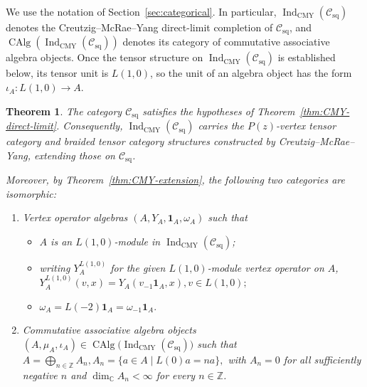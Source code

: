 \documentclass[12pt,leqno]{amsart}
\numberwithin{equation}{section} \newtheorem{thm}{Theorem}[section] \newtheorem{lem}[thm]{Lemma} \newtheorem{ex}[thm]{Example} \newtheorem{prop}[thm]{Proposition} \newtheorem{cor}[thm]{Corollary} \newtheorem{defi}[thm]{Definition} \newtheorem{rmk}[thm]{Remark} \newtheorem{notation}[thm]{Notation}
\newcommand{\one}{\mathbf{1}}
\newcommand{\Csq}{\mathcal C_{\mathrm{sq}}}
\newcommand{\CAlg}{\operatorname{CAlg}}
\newcommand{\IndCMY}{\operatorname{Ind}_{\mathrm{CMY}}}
\def\Z{\mathbb{Z}} \def\N{\mathbb{N}} \def\A{\mathbb{A}} \def\C{\mathbb{C}} \def\R{\mathbb{R}} \def\Q{\mathbb{Q}} \def\F{\mathbb{F}}
\begin{document}
We use the notation of Section~\ref{sec:categorical}. In particular, $\IndCMY(\Csq)$ denotes the Creutzig--McRae--Yang direct-limit completion of $\Csq$, and $\CAlg(\IndCMY(\Csq))$ denotes its category of commutative associative algebra objects. Once the tensor structure on $\IndCMY(\Csq)$ is established below, its tensor unit is $L(1,0)$, so the unit of an algebra object has the form \(\iota_A:L(1,0)\longrightarrow A\).
\begin{thm}\label{thm:CMY-square}
The category $\Csq$ satisfies the hypotheses of Theorem~\ref{thm:CMY-direct-limit}. Consequently, $\IndCMY(\Csq)$ carries the $P(z)$-vertex tensor category and braided tensor category structures constructed by Creutzig--McRae--Yang, extending those on $\Csq$.

Moreover, by Theorem~\ref{thm:CMY-extension}, the following two categories are isomorphic:
\begin{enumerate}[label=\textnormal{(\arabic*)}]
\item Vertex operator algebras $(A,Y_A,\one_A,\omega_A)$ such that
\begin{itemize}
\item $A$ is an $L(1,0)$-module in $\IndCMY(\Csq)$;
\item writing $Y_A^{L(1,0)}$ for the given $L(1,0)$-module vertex
operator on $A$, \(Y_A^{L(1,0)}(v,x)=Y_A(v_{-1}\one_A,x),v\in L(1,0);\)
\item \(\omega_A=L(-2)\one_A=\omega_{-1}\one_A.\)
\end{itemize}

\item Commutative associative algebra objects \((A,\mu_A,\iota_A)\in\CAlg\bigl(\IndCMY(\Csq)\bigr)\)
such that \(A=\bigoplus_{n\in\Z}A_n,A_n=\{a\in A\mid L(0)a=na\},\) with $A_n=0$ for all sufficiently negative $n$ and $\dim_{\C}A_n<\infty$ for every $n\in\Z$.
\end{enumerate}
\end{thm}
\end{document}
